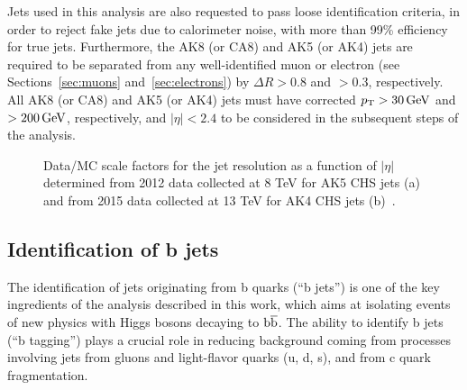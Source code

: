 Jets used in this analysis are also requested to pass loose identification criteria, in order to reject fake jets due to calorimeter noise, with more than 99\% efficiency for true jets. Furthermore, the AK8 (or CA8) and AK5 (or AK4) jets are required to be separated from any well-identified muon or electron (see Sections~\ref{sec:muons} and~\ref{sec:electrons}) by $\Delta R > 0.8$ and $> 0.3$, respectively. All AK8 (or CA8) and AK5 (or AK4) jets must have corrected $p_{\mathrm{T}} > 30\,\text{Ge\hspace{-.08em}V}$ and $> 200\,\text{Ge\hspace{-.08em}V}$, respectively, and $|\eta| < 2.4$ to be considered in the subsequent steps of the analysis.

\begin{figure}[!htb]
\begin{center}
\end{center} 
\caption{Data/MC scale factors for the jet \pt resolution as a function of $|\eta|$ determined from 2012 data collected at 8 TeV for AK5 CHS jets (a) and from 2015 data collected at 13 TeV for AK4 CHS jets (b)~\cite{Khachatryan:2016kdb,CMS-DP-2016-020}.}
\label{fig:resolcorr813TeV}
\end{figure}

\subsection{Identification of b jets}\label{subsec:bjets}

The identification of jets originating from b quarks (``b jets'') is one of the key ingredients of the analysis described in this work, which aims at isolating events of new physics with Higgs bosons decaying to ${\mathrm{b}\overline{\mathrm{b}}}$. The ability to identify b jets (``b tagging'') plays a crucial role in reducing background coming from processes involving jets from gluons and light-flavor quarks (u, d, s), and from c quark fragmentation.

